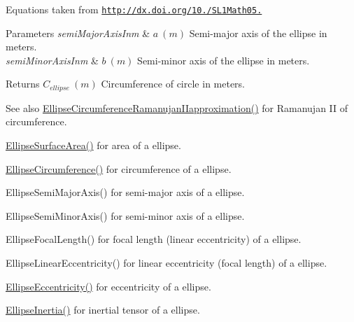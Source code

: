 Equations taken from \href{http://dx.doi.org/10.3247/SL1Math05.004}{\tt http\+://dx.\+doi.\+org/10./\+S\+L1\+Math05.} 
\begin{DoxyParams}{Parameters}
{\em semi\+Major\+Axis\+Inm} & $ a\ (m)$ Semi-\/major axis of the ellipse in meters. \\
\hline
{\em semi\+Minor\+Axis\+Inm} & $ b\ (m)$ Semi-\/minor axis of the ellipse in meters. \\
\hline
\end{DoxyParams}
\begin{DoxyReturn}{Returns}
$ C_{ellipse}\ (m)$ Circumference of circle in meters. 
\end{DoxyReturn}
\begin{DoxySeeAlso}{See also}
\mbox{\hyperlink{group___e_g_x_math-_geometry-2_d-_ellipse_gaa908406db81fadc7c2d73e4e113d24d7}{Ellipse\+Circumference\+Ramanujan\+I\+Iapproximation()}} for Ramanujan II of circumference. 

\mbox{\hyperlink{group___e_g_x_math-_geometry-2_d-_ellipse_ga4ce8c8323e9718ce5458f4ab7f6d823d}{Ellipse\+Surface\+Area()}} for area of a ellipse. 

\mbox{\hyperlink{group___e_g_x_math-_geometry-2_d-_ellipse_ga4172802ac674eb53467b44928ac635c7}{Ellipse\+Circumference()}} for circumference of a ellipse. 

Ellipse\+Semi\+Major\+Axis() for semi-\/major axis of a ellipse. 

Ellipse\+Semi\+Minor\+Axis() for semi-\/minor axis of a ellipse. 

Ellipse\+Focal\+Length() for focal length (linear eccentricity) of a ellipse. 

Ellipse\+Linear\+Eccentricity() for linear eccentricity (focal length) of a ellipse. 

\mbox{\hyperlink{group___e_g_x_math-_geometry-2_d-_ellipse-_eccentricity_ga6a0a7fba17f782616894cfc447628c33}{Ellipse\+Eccentricity()}} for eccentricity of a ellipse. 

\mbox{\hyperlink{group___e_g_x_math-_geometry-2_d-_ellipse_gad679a65dc7550e27dc69c1d328c94732}{Ellipse\+Inertia()}} for inertial tensor of a ellipse. 
\end{DoxySeeAlso}
\mbox{\label{group___e_g_x_math-_geometry-2_d-_ellipse_gaa908406db81fadc7c2d73e4e113d24d7}} 
